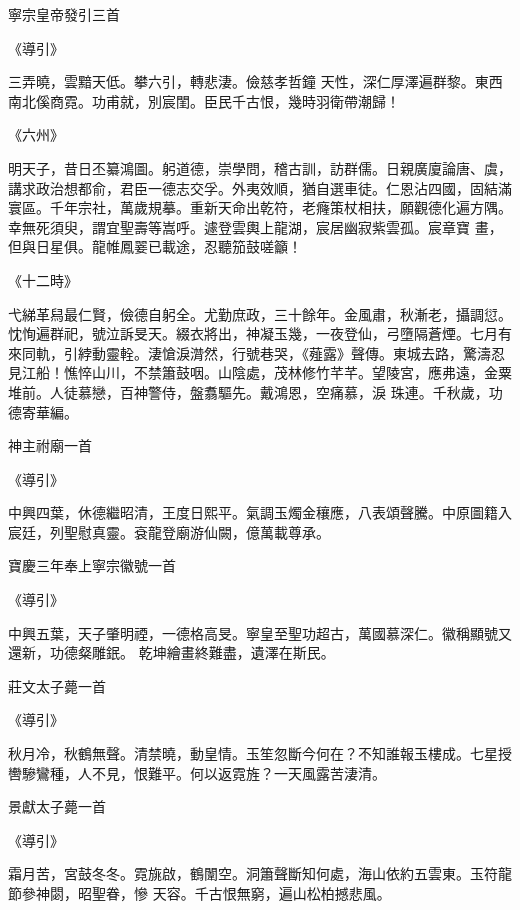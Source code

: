 \begin{pinyinscope}
 寧宗皇帝發引三首



 《導引》



 三弄曉，雲黯天低。攀六引，轉悲淒。儉慈孝哲鐘
 天性，深仁厚澤遍群黎。東西南北傒商霓。功甫就，別宸閨。臣民千古恨，幾時羽衛帶潮歸！



 《六州》



 明天子，昔日丕纂鴻圖。躬道德，崇學問，稽古訓，訪群儒。日親廣廈論唐、虞，講求政治想都俞，君臣一德志交孚。外夷效順，猶自選車徒。仁恩沾四國，固結滿寰區。千年宗社，萬歲規摹。重新天命出乾符，老癃策杖相扶，願觀德化遍方隅。幸無死須臾，謂宜聖壽等嵩呼。遽登雲輿上龍湖，宸居幽寂紫雲孤。宸章寶
 畫，但與日星俱。龍帷鳳翣已載途，忍聽笳鼓嗟籲！



 《十二時》



 弋綈革舄最仁賢，儉德自躬全。尤勤庶政，三十餘年。金風肅，秋漸老，攝調愆。忱恂遍群祀，號泣訴旻天。綴衣將出，神凝玉幾，一夜登仙，弓墮隔蒼煙。七月有來同軌，引綍動靈輇。淒愴淚潸然，行號巷哭，《薤露》聲傳。東城去路，驚濤忍見江船！憔悴山川，不禁簫鼓咽。山陰處，茂林修竹芊芊。望陵宮，應弗遠，金粟堆前。人徒慕戀，百神警侍，盤翥驅先。戴鴻恩，空痛慕，淚
 珠連。千秋歲，功德寄華編。



 神主祔廟一首



 《導引》



 中興四葉，休德繼昭清，王度日熙平。氣調玉燭金穰應，八表頌聲騰。中原圖籍入宸廷，列聖慰真靈。袞龍登廟游仙闕，億萬載尊承。



 寶慶三年奉上寧宗徽號一首



 《導引》



 中興五葉，天子肇明禋，一德格高旻。寧皇至聖功超古，萬國慕深仁。徽稱顯號又還新，功德粲雕鈱。
 乾坤繪畫終難盡，遺澤在斯民。



 莊文太子薨一首



 《導引》



 秋月冷，秋鶴無聲。清禁曉，動皇情。玉笙忽斷今何在？不知誰報玉樓成。七星授轡驂鸞種，人不見，恨難平。何以返霓旌？一天風露苦淒清。



 景獻太子薨一首



 《導引》



 霜月苦，宮鼓冬冬。霓旐啟，鶴闈空。洞簫聲斷知何處，海山依約五雲東。玉符龍節參神閟，昭聖眷，慘
 天容。千古恨無窮，遍山松柏撼悲風。



\end{pinyinscope}
